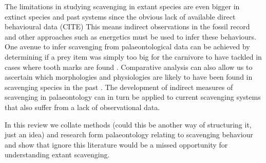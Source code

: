 \documentclass[a4paper,12pt]{article}
\begin{document}
The limitations in studying scavenging in extant species are even bigger in extinct species and past systems since the obvious lack of available direct behavioural data (CITE) %
This means indirect observations in the fossil record and other approaches such as energetics must be used to infer these behaviours. %
One avenue to infer scavenging from palaeontological data can be achieved by determining if a prey item was simply too big for the carnivore to have tackled in cases where tooth marks are found \citep{pobiner2008paleoecological}. 
Comparative analysis can also allow us to ascertain which morphologies and physiologies are likely to have been found in scavenging species in the past \citep{ruxton2004obligate}.
The development of indirect measures of scavenging in palaeontology can in turn be applied to current scavenging systems that also suffer from a lack of observational data.

In this review we collate methods (could this be another way of structuring it, just an idea) and research form palaeontology relating to scavenging behaviour and show that ignore this literature would be a missed opportunity for understanding extant scavenging.
\end{document}
